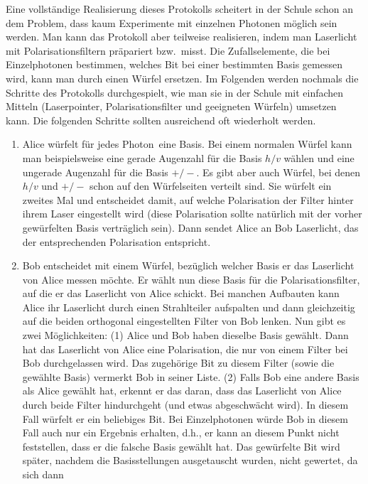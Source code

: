 Eine vollst\"andige Realisierung dieses Protokolls scheitert in der Schule schon an dem Problem,
dass kaum Experimente mit einzelnen Photonen m\"oglich sein werden. Man kann das Protokoll
aber teilweise realisieren, indem man Laserlicht mit Polarisationsfiltern pr\"apariert bzw.\ misst.
Die Zufallselemente, die bei Einzelphotonen bestimmen, welches Bit bei einer bestimmten Basis
gemessen wird, kann man durch einen W\"urfel ersetzen. Im Folgenden werden nochmals die
Schritte des Protokolls durchgespielt, wie man sie in der Schule mit einfachen Mitteln (Laserpointer,
Polarisationsfilter und geeigneten W\"urfeln) umsetzen kann. Die folgenden Schritte sollten 
ausreichend oft wiederholt werden. 

\begin{enumerate}
\item
Alice w\"urfelt f\"ur jedes \glqq Photon\grqq\ eine Basis. Bei einem normalen W\"urfel kann man
beispielsweise eine gerade Augenzahl f\"ur die Basis $h/v$ w\"ahlen und eine ungerade Augenzahl
f\"ur die Basis $+/-$. Es gibt aber auch W\"urfel, bei denen $h/v$ und $+/-$ schon auf den W\"urfelseiten
verteilt sind. Sie w\"urfelt ein zweites Mal und entscheidet damit, auf welche Polarisation der
Filter hinter ihrem Laser eingestellt wird (diese Polarisation sollte nat\"urlich mit der vorher
gew\"urfelten Basis vertr\"aglich sein). Dann sendet Alice an Bob Laserlicht, das der entsprechenden
Polarisation entspricht. 
\item
Bob entscheidet mit einem W\"urfel, bez\"uglich welcher Basis er das Laserlicht von Alice
messen m\"ochte. Er w\"ahlt nun diese Basis f\"ur die Polarisationsfilter, auf die er das Laserlicht
von Alice schickt. Bei manchen Aufbauten kann Alice ihr Laserlicht durch einen Strahlteiler
aufspalten und dann gleichzeitig auf die beiden orthogonal eingestellten Filter von Bob lenken.
Nun gibt es zwei M\"oglichkeiten: (1) Alice und Bob haben dieselbe Basis gew\"ahlt. Dann hat das
Laserlicht von Alice eine Polarisation, die nur von einem Filter bei Bob durchgelassen wird. 
Das zugeh\"orige Bit zu diesem Filter (sowie die gew\"ahlte Basis) vermerkt Bob in seiner Liste.
(2) Falls Bob eine andere Basis als Alice gew\"ahlt hat, erkennt er das daran, dass das Laserlicht von
Alice durch beide Filter hindurchgeht (und etwas abgeschw\"acht wird). 
In diesem Fall w\"urfelt er ein beliebiges Bit. Bei Einzelphotonen
w\"urde Bob in diesem Fall auch nur ein Ergebnis erhalten, d.h., er kann an diesem Punkt nicht
feststellen, dass er die falsche Basis gew\"ahlt hat. Das gew\"urfelte Bit
wird sp\"ater, nachdem die Basisstellungen ausgetauscht wurden, nicht gewertet, da sich dann

\end{enumerate}
